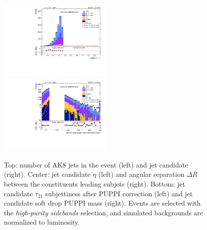 \begin{figure}[!htb]
\begin{center}
    \includegraphics[width=0.495\textwidth]{plots/v9_thesis/XVZnnhpSB/FatJet1_puppiTau21.pdf}
    \includegraphics[width=0.495\textwidth]{plots/v9_thesis/XVZnnhpSB/FatJet1_softdropPuppiMassCorr.pdf}

    \caption{Top: number of AK8 jets in the event (left) and \V jet candidate \pt (right). Center: \V jet candidate $\eta$ (left) and angular separation $\Delta R$ between the constituents leading subjets (right). Bottom: \V jet candidate $\tau_{21}$ subjettiness after PUPPI correction (left) and \V jet candidate soft drop PUPPI mass (right). Events are selected with the \emph{high-purity sidebands} selection, and simulated backgrounds are normalized to luminosity.}
  \end{center}
\end{figure}

\clearpage

